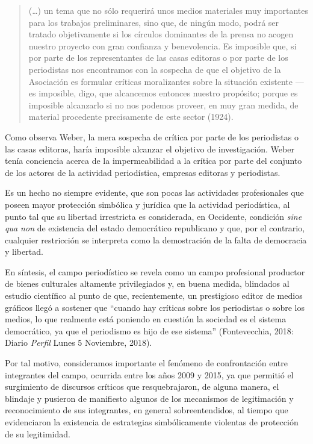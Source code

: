 {\begin{quote}
(\ldots) un tema que no sólo requerirá unos medios materiales muy importantes para los trabajos preliminares, sino que, de ningún modo, podrá ser tratado objetivamente si los círculos dominantes de la prensa no acogen nuestro proyecto con gran confianza y benevolencia. Es imposible que, si por parte de los representantes de las casas editoras o por parte de los periodistas nos encontramos con la sospecha de que el objetivo de la Asociación es formular críticas moralizantes sobre la situación existente ---es imposible, digo, que alcancemos entonces nuestro propósito; porque es imposible alcanzarlo si no nos podemos proveer, en muy gran medida, de material procedente precisamente de este sector (1924).
\end{quote}

Como observa Weber, la mera sospecha de crítica por parte de los periodistas o las casas editoras, haría imposible alcanzar el objetivo de investigación. Weber tenía conciencia acerca de la impermeabilidad a la crítica por parte del conjunto de los actores de la actividad periodística, empresas editoras y periodistas.

Es un hecho no siempre evidente, que son pocas las actividades profesionales que poseen mayor protección simbólica y jurídica que la actividad periodística, al punto tal que su libertad irrestricta es considerada, en Occidente, condición \emph{sine qua non} de existencia del estado democrático republicano y que, por el contrario, cualquier restricción se interpreta como la demostración de la falta de democracia y libertad.

En síntesis, el campo periodístico se revela como un campo profesional productor de bienes culturales altamente privilegiados y, en buena medida, blindados al estudio científico al punto de que, recientemente, un prestigioso editor de medios gráficos llegó a sostener que \enquote{cuando hay críticas sobre los periodistas o sobre los medios, lo que realmente está poniendo en cuestión la sociedad es el sistema democrático, ya que el periodismo es hijo de ese sistema} (Fontevecchia, 2018: Diario \emph{Perfil} Lunes 5 Noviembre, 2018).

Por tal motivo, consideramos importante el fenómeno de confrontación entre integrantes del campo, ocurrida entre los años 2009 y 2015, ya que permitió el surgimiento de discursos críticos que resquebrajaron, de alguna manera, el blindaje y pusieron de manifiesto algunos de los mecanismos de legitimación y reconocimiento de sus integrantes, en general sobreentendidos, al tiempo que evidenciaron la existencia de estrategias simbólicamente violentas de protección de su legitimidad.

}
